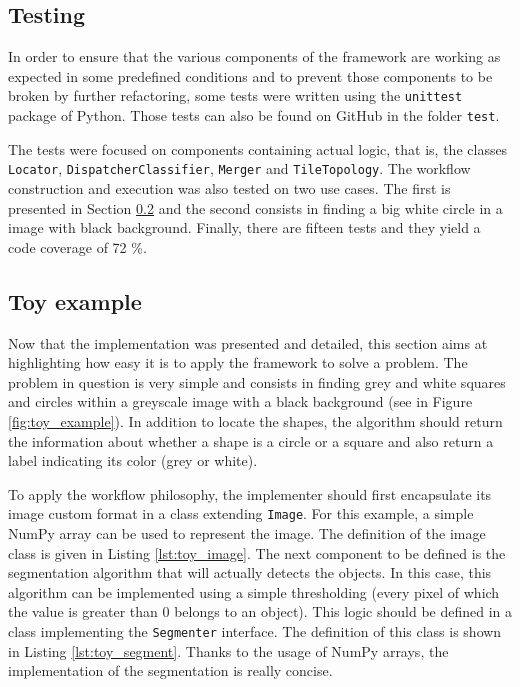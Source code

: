 \subsection{Testing}
\label{ssec:work_test}
In order to ensure that the various components of the framework are working as expected in some predefined conditions and to prevent those components to be broken by further refactoring, some tests were written using the \texttt{unittest} package of Python. Those tests can also be found on GitHub in the folder \texttt{test}. 

The tests were focused on components containing actual logic, that is, the classes \texttt{Locator}, \texttt{DispatcherClassifier}, \texttt{Merger} and \texttt{TileTopology}. The workflow construction and execution was also tested on two use cases. The first is presented in Section \ref{ssec:work_toy_example} and the second consists in finding a big white circle in a image with black background. Finally, there are fifteen tests and they yield a code coverage of 72 \%.\\

\subsection{Toy example}
\label{ssec:work_toy_example}
Now that the implementation was presented and detailed, this section aims at highlighting how easy it is to apply the framework to solve a problem. The problem in question is very simple and consists in finding grey and white squares and circles within a greyscale image with a black background (see in Figure \ref{fig:toy_example}). In addition to locate the shapes, the algorithm should return the information about whether a shape is a circle or a square and also return a label indicating its color (grey or white). 

To apply the workflow philosophy, the implementer should first encapsulate its image custom format in a class extending \texttt{Image}. For this example, a simple NumPy array can be used to represent the image. The definition of the image class is given in Listing \ref{lst:toy_image}. The next component to be defined is the segmentation algorithm that will actually detects the objects. In this case, this algorithm can be implemented using a simple thresholding (every pixel of which the value is greater than 0 belongs to an object). This logic should be defined in a class implementing the \texttt{Segmenter} interface. The definition of this class is shown in Listing \ref{lst:toy_segment}. Thanks to the usage of NumPy arrays, the implementation of the segmentation is really concise. 

